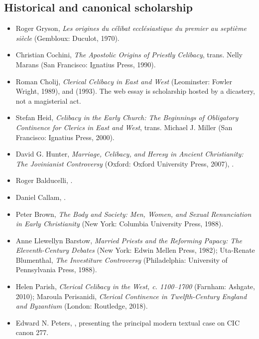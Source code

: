 \subsection{Historical and canonical scholarship}

\begin{itemize}
\item Roger Gryson, \emph{Les origines du célibat ecclésiastique du premier au septième siècle} (Gembloux: Duculot, 1970).
\item Christian Cochini, \emph{The Apostolic Origins of Priestly Celibacy}, trans. Nelly Marans (San Francisco: Ignatius Press, 1990).
\item Roman Cholij, \emph{Clerical Celibacy in East and West} (Leominster: Fowler Wright, 1989), and  (1993). The web essay is scholarship hosted by a dicastery, not a magisterial act.
\item Stefan Heid, \emph{Celibacy in the Early Church: The Beginnings of Obligatory Continence for Clerics in East and West}, trans. Michael J. Miller (San Francisco: Ignatius Press, 2000).
\item David G. Hunter, \emph{Marriage, Celibacy, and Heresy in Ancient Christianity: The Jovinianist Controversy} (Oxford: Oxford University Press, 2007), .
\item Roger Balducelli, .
\item Daniel Callam, .
\item Peter Brown, \emph{The Body and Society: Men, Women, and Sexual Renunciation in Early Christianity} (New York: Columbia University Press, 1988).
\item Anne Llewellyn Barstow, \emph{Married Priests and the Reforming Papacy: The Eleventh-Century Debates} (New York: Edwin Mellen Press, 1982); Uta-Renate Blumenthal, \emph{The Investiture Controversy} (Philadelphia: University of Pennsylvania Press, 1988).
\item Helen Parish, \emph{Clerical Celibacy in the West, c. 1100--1700} (Farnham: Ashgate, 2010); Maroula Perisanidi, \emph{Clerical Continence in Twelfth-Century England and Byzantium} (London: Routledge, 2018).
\item Edward N. Peters, , presenting the principal modern textual case on CIC canon 277.
\end{itemize}

